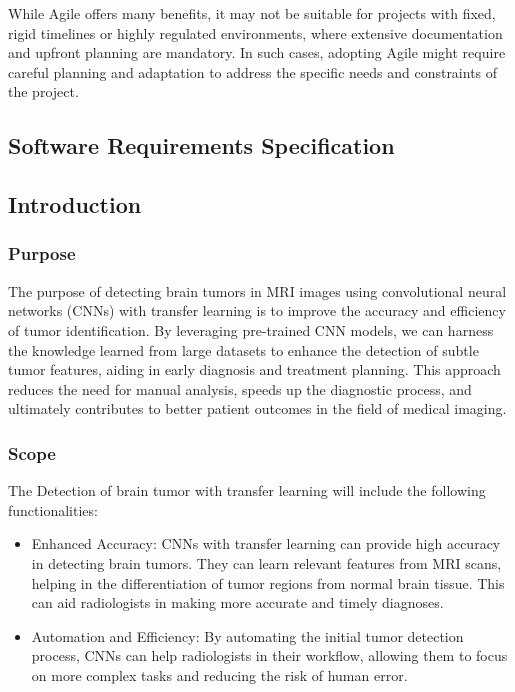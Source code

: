 While Agile offers many benefits, it may not be suitable for projects with fixed, rigid timelines or highly regulated environments, where extensive documentation and upfront planning are mandatory. In such cases, adopting Agile might require careful planning and adaptation to address the specific needs and constraints of the project.













\newpage

\vspace{0.25cm}


\subsection{Software Requirements Specification}
\subsection{Introduction}
\subsubsection{Purpose}
The purpose of detecting brain tumors in MRI images using convolutional neural networks (CNNs) with transfer learning is to improve the accuracy and efficiency of tumor identification. By leveraging pre-trained CNN models, we can harness the knowledge learned from large datasets to enhance the detection of subtle tumor features, aiding in early diagnosis and treatment planning. This approach reduces the need for manual analysis, speeds up the diagnostic process, and ultimately contributes to better patient outcomes in the field of medical imaging.

\subsubsection{Scope}
The Detection of brain tumor with transfer
learning will include the following functionalities:
\begin{itemize}
    \item Enhanced Accuracy: CNNs with transfer learning can provide high accuracy in detecting brain tumors. They can learn relevant features from MRI scans, helping in the differentiation of tumor regions from normal brain tissue. This can aid radiologists in making more accurate and timely diagnoses.
    \item Automation and Efficiency: By automating the initial tumor detection process, CNNs can help radiologists in their workflow, allowing them to focus on more complex tasks and reducing the risk of human error.
\end{itemize}

